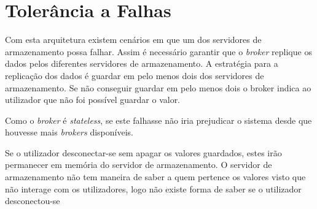 \chapter{Tolerância a Falhas}

Com esta arquitetura existem cenários em que um dos servidores de armazenamento possa falhar. Assim é necessário garantir que o \textit{broker} replique os dados pelos diferentes servidores de armazenamento. A estratégia para a replicação dos dados é guardar em pelo menos dois dos servidores de armazenamento. Se não conseguir guardar em pelo menos dois o broker indica ao utilizador que não foi possível guardar o valor.

Como o \textit{broker} é \textit{stateless}, se este falhasse não iria prejudicar o sistema desde que houvesse mais \textit{brokers} disponíveis.

Se o utilizador desconectar-se sem apagar os valores guardados, estes irão permanecer em memória do servidor de armazenamento. O servidor de armazenamento não tem maneira de saber a quem pertence os valores visto que não interage com os utilizadores, logo não existe forma de saber se o utilizador desconectou-se